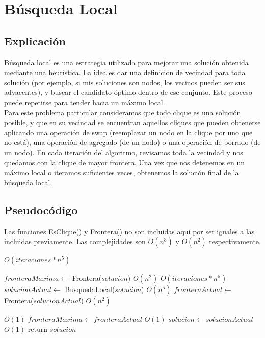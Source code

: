 \section{Búsqueda Local}

\subsection{Explicación}

Búsqueda local es una estrategia utilizada para mejorar una solución obtenida mediante una heurística. La idea es dar una definición de vecindad para toda solución (por ejemplo, si mis soluciones son nodos, los vecinos pueden ser sus adyacentes), y buscar el candidato óptimo dentro de ese conjunto. Este proceso puede repetirse para tender hacia un máximo local. \\

Para este problema particular consideramos que todo clique es una solución posible, y que en su vecindad se encuentran aquellos cliques que pueden obtenerse aplicando una operación de swap (reemplazar un nodo en la clique por uno que no está), una operación de agregado (de un nodo) o una operación de borrado (de un nodo). En cada iteración del algoritmo, revisamos toda la vecindad y nos quedamos con la clique de mayor frontera. Una vez que nos detenemos en un máximo local o iteramos suficientes veces, obtenemos la solución final de la búsqueda local.

\subsection{Pseudocódigo}

Las funciones EsClique() y Frontera() no son incluidas aquí por ser iguales a las incluidas previamente. Las complejidades son $O(n^3)$ y $O(n^2)$ respectivamente.

\begin{algorithm}[H]
\begin{algorithmic}
          \Comment $O(iteraciones * n^5)$

    \State $fronteraMaxima \gets$ Frontera($solucion$)                      \Comment $O(n^2)$
                                             \Comment $O(iteraciones * n^5)$
        \State $solucionActual \gets$ BusquedaLocal($solucion$)             \Comment $O(n^5)$
        \State $fronteraActual \gets$ Frontera($solucionActual$)            \Comment $O(n^2)$

                                      \Comment $O(1)$
            \State $fronteraMaxima \gets fronteraActual$                    \Comment $O(1)$
            \State $solucion \gets solucionActual$                          \Comment $O(1)$
        \EndIf
    \EndFor
    \State return $solucion$

\EndFunction
\end{algorithmic}
\end{algorithm}


